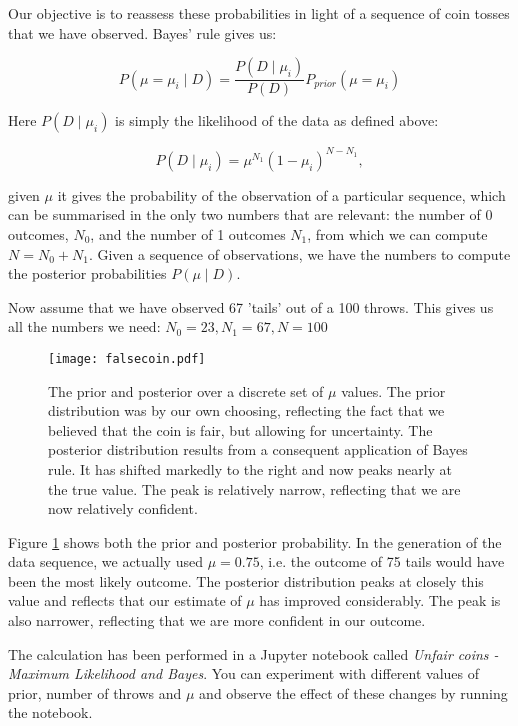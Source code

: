 Our objective is to reassess these probabilities in light of a sequence of coin tosses that we have observed.
Bayes' rule gives us:

\begin{equation}
P(\mu = \mu_i \mid D ) = \frac{P(D \mid \mu_i)}{P(D)} P_{prior}(\mu = \mu_i)
\label{eq-posteriormu}
\end{equation}

Here $P(D \mid \mu_i)$ is simply the likelihood of the data as defined above:

$$
P(D \mid \mu_i) = \mu^{N_1}(1 - \mu_i)^{N - N_1},
$$

given $\mu$ it gives the probability of the observation of a particular sequence, which can be summarised in the only two numbers that are relevant: the number of 0 outcomes, $N_
0$, and the number of 1 outcomes $N_1$, from which we can compute $N= N_0 + N_1$.
Given a sequence of observations, we have the numbers to compute the posterior probabilities $P(\mu \mid D)$.


Now assume that we have observed 67 'tails' out of a 100 throws. This gives us all the numbers we need: $N_0 = 23, N_1 = 67, N= 100$
\begin{figure}[!ht]
\begin{center}
\texttt{[image: falsecoin.pdf]}
\end{center}
\label{fig-falsecoin}
\caption{The prior and posterior over a discrete set of $\mu$ values. The prior distribution was by our own choosing, reflecting the fact that we believed that the coin is fair, but allowing for uncertainty. The posterior distribution results from a consequent application of Bayes rule. It has shifted markedly to the right and now peaks nearly at the true value. The peak is relatively narrow, reflecting that we are now relatively confident.}
\end{figure}

Figure \ref{fig-falsecoin} shows both the prior and posterior probability. In the generation of the data sequence, we actually used $\mu = 0.75$, i.e. the outcome
of 75 tails would have been the most likely outcome. The posterior distribution peaks at closely this value and reflects that our estimate of $\mu$ has improved considerably.
The peak is also narrower, reflecting that we are more confident in our outcome.

The calculation has been performed in a Jupyter notebook called \emph{Unfair coins - Maximum Likelihood and Bayes}. You can experiment with different values of prior, number of throws and $\mu$ and observe the effect of these changes by running the notebook.


